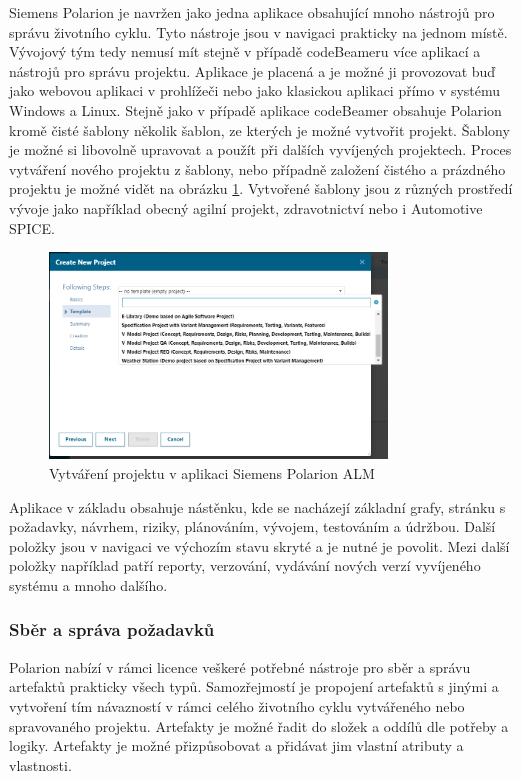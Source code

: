 \documentclass[czech,master,public,dept460,male,cpdeclaration,oneside]{diploma}
\begin{document}
Siemens Polarion je navržen jako jedna aplikace obsahující mnoho nástrojů pro správu životního cyklu. Tyto nástroje jsou v navigaci prakticky na jednom místě. Vývojový tým tedy nemusí mít stejně v případě codeBeameru více aplikací a nástrojů pro správu projektu. Aplikace je placená a je možné ji provozovat buď jako webovou aplikaci v prohlížeči nebo jako klasickou aplikaci přímo v systému Windows a Linux. Stejně jako v případě aplikace codeBeamer obsahuje Polarion kromě čisté šablony několik šablon, ze kterých je možné vytvořit projekt. Šablony je možné si libovolně upravovat a použít při dalších vyvíjených projektech. Proces vytváření nového projektu z šablony, nebo případně založení čistého a prázdného projektu je možné vidět na obrázku \ref{fig:polarion_new_project}. Vytvořené šablony jsou z různých prostředí vývoje jako například obecný agilní projekt, zdravotnictví nebo i Automotive SPICE. 


\begin{figure}[!ht]
    \centering
    \includegraphics[width=0.8\textwidth]{Diplomka/Figures/polarion_create_project.png}
    \caption{Vytváření projektu v aplikaci Siemens Polarion ALM}
    \label{fig:polarion_new_project}
\end{figure}


Aplikace v základu obsahuje nástěnku, kde se nacházejí základní grafy, stránku s požadavky, návrhem, riziky, plánováním, vývojem, testováním a údržbou. Další položky jsou v navigaci ve výchozím stavu skryté a je nutné je povolit. Mezi další položky například patří reporty, verzování, vydávání nových verzí vyvíjeného systému a mnoho dalšího.

\subsubsection{Sběr a správa požadavků}
Polarion nabízí v rámci licence veškeré potřebné nástroje pro sběr a správu artefaktů prakticky všech typů. Samozřejmostí je propojení artefaktů s jinými a vytvoření tím návazností v rámci celého životního cyklu vytvářeného nebo spravovaného projektu. Artefakty je možné řadit do složek a oddílů dle potřeby a logiky. Artefakty je možné přizpůsobovat a přidávat jim vlastní atributy a vlastnosti.
\end{document}
